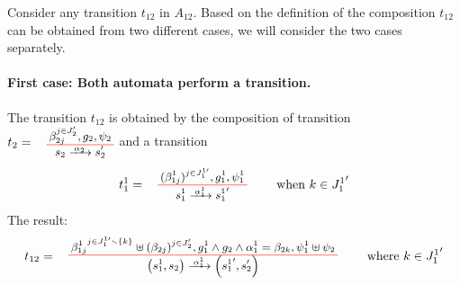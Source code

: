 \documentclass[runningheads]{llncs}
\begin{document}
\begin{enumerate}
Consider any transition $t_{12}$ in $A_{12}$. Based on the definition of the composition  $t_{12}$ can be obtained from two different cases,  we will consider the two cases
separately.


\paragraph{First case: Both automata perform a transition.} The transition $t_{12}$  is obtained by the composition of transition $t_2=\OTx{2}{}{2}{2}$ and a transition \[t_1^1=
\OT{ s^1_1}{{s^1_1}'}{\alpha_1^1}{   {(\beta^1_{1j})^{j \in J^{1 \prime}_1} }}{ g^1_1 }{ \psi^1_1} \qquad \text{ when } k \in {J^1_{1}}^{\prime}
\] The result:
\[
t_{12} = \OT{\mpar{s^1_1, s_2}}{\mpar{{s^1_1}',s'_2 }}{\alpha^1_1}{{\beta^1_{1j}}^{j \in J^{1 \prime}_1 \setminus \{k\}} \uplus  {(\beta_{2j})^{j \in J^{\prime}_2} }}{g^1_1 \wedge g_2 \wedge \alpha^1_1 = \beta_{2k}}{\psi^1_1 \uplus \psi_2} \qquad \text{ where } k \in {J^1_{1}}^{\prime} 
\]


\end{enumerate}
\end{document}

